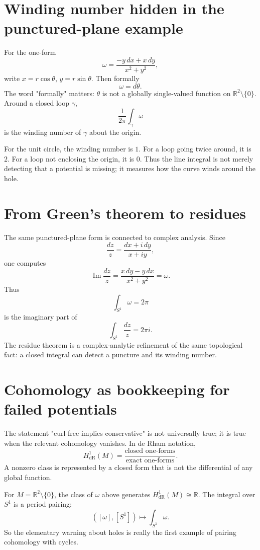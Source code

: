 \section{Winding number hidden in the punctured-plane example}

For the one-form
\[
  \omega=\frac{-y\,dx+x\,dy}{x^2+y^2},
\]
write \(x=r\cos\theta\), \(y=r\sin\theta\).  Then formally
\[
  \omega=d\theta.
\]
The word "formally" matters: \(\theta\) is not a globally single-valued function on \(\mathbb R^2\setminus\{0\}\).  Around a closed loop \(\gamma\),
\[
  \frac{1}{2\pi}\int_\gamma \omega
\]
is the winding number of \(\gamma\) about the origin.

For the unit circle, the winding number is \(1\).  For a loop going twice around, it is \(2\).  For a loop not enclosing the origin, it is \(0\).  Thus the line integral is not merely detecting that a potential is missing; it measures how the curve winds around the hole.

\section{From Green's theorem to residues}

The same punctured-plane form is connected to complex analysis.  Since
\[
  \frac{dz}{z}=\frac{dx+i\,dy}{x+iy},
\]
one computes
\[
  \operatorname{Im}\frac{dz}{z}
  =\frac{x\,dy-y\,dx}{x^2+y^2}=\omega.
\]
Thus
\[
  \int_{S^1}\omega=2\pi
\]
is the imaginary part of
\[
  \int_{S^1}\frac{dz}{z}=2\pi i.
\]
The residue theorem is a complex-analytic refinement of the same topological fact: a closed integral can detect a puncture and its winding number.

\section{Cohomology as bookkeeping for failed potentials}

The statement "curl-free implies conservative" is not universally true; it is true when the relevant cohomology vanishes.  In de Rham notation,
\[
  H^1_{\mathrm{dR}}(M)
  =\frac{\text{closed one-forms}}{\text{exact one-forms}}.
\]
A nonzero class is represented by a closed form that is not the differential of any global function.

For \(M=\mathbb R^2\setminus\{0\}\), the class of \(\omega\) above generates \(H^1_{\mathrm{dR}}(M)\cong\mathbb R\).  The integral over \(S^1\) is a period pairing:
\[
  ([\omega],[S^1])\longmapsto \int_{S^1}\omega.
\]
So the elementary warning about holes is really the first example of pairing cohomology with cycles.

